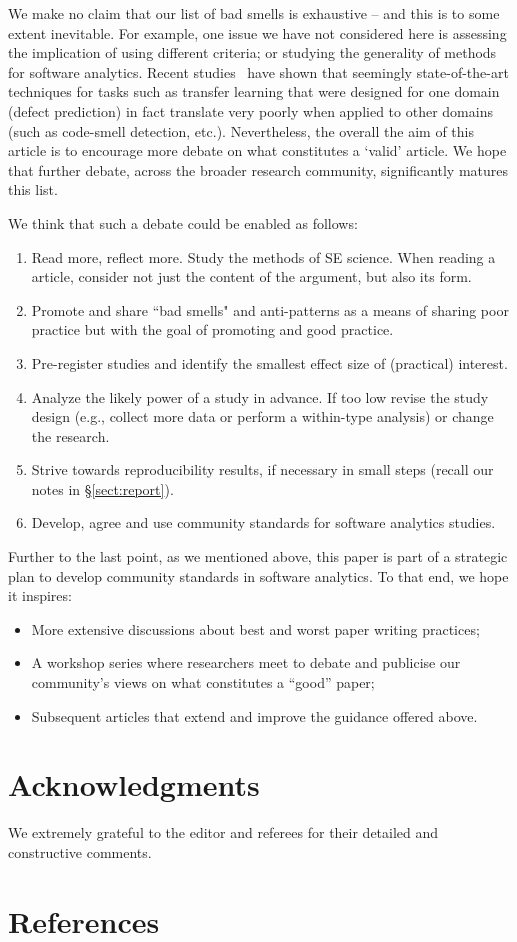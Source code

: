 \documentclass[preprint,10pt]{elsarticle}
\newcommand{\bi}{\begin{itemize}}
\newcommand{\ei}{\end{itemize}}
\begin{document}
We make no claim that our  list of bad smells is exhaustive --  and this is to some extent inevitable. For example, one issue we have not considered here is assessing the implication of using different criteria; or studying the generality of methods for software analytics.  Recent studies~\cite{krishna18a} have shown that seemingly state-of-the-art techniques for tasks such as transfer learning that were designed for one domain (defect prediction) in fact translate very poorly when applied to other domains (such as code-smell detection, etc.).
Nevertheless, the overall the aim of this article is to encourage more debate on what constitutes a `valid' article. We hope that further debate, across the broader research community, significantly matures this list.

We think that such a debate could be enabled as follows:
\begin{enumerate}
    \item Read more, reflect more. Study the methods of SE science.%
    When reading a article, consider not just the content of the argument, but also its form.
    \item Promote and share ``bad smells" and anti-patterns as a means of sharing poor practice but with the goal of promoting and good practice.
    \item Pre-register studies and identify the smallest effect size of (practical) interest.
    \item Analyze the likely power of a study in advance. If too low  revise the study design (e.g., collect more data or perform a within-type analysis) or change the research.
    \item Strive towards 
    reproducibility
    results,  if necessary in small steps (recall our notes    in \S\ref{sect:report}).
     \item Develop, agree and use community standards  for software analytics studies.
     \end{enumerate}
Further to the last point, as we mentioned above, this paper is part of a strategic plan to develop community standards in software analytics.  To that end, we hope it inspires:
     \bi
     \item More  extensive discussions about best and worst paper writing practices; 
\item A workshop series where researchers meet to debate and publicise our community's views on what constitutes a ``good''  paper;
\item Subsequent articles
that extend and improve the guidance offered above.
\ei
  
\section*{Acknowledgments}
\noindent
We extremely grateful to the editor and referees for their detailed and constructive comments.

\section*{References}


 
\end{document}
